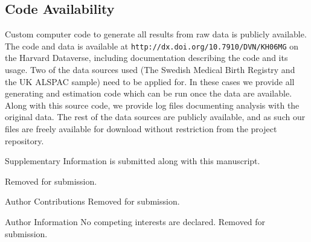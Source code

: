 \documentclass{nature}
\begin{document}
\begin{linenumbers}
\subsection{Code Availability}
Custom computer code to generate all results from raw data is publicly available. The code and data is available at \texttt{http://dx.doi.org/10.7910/DVN/KH06MG} on the Harvard Dataverse, including documentation describing the code and its usage. Two of the data sources used (The Swedish Medical Birth Registry and the UK ALSPAC sample) need to be applied for. In these cases we provide all generating and estimation code which can be run once the data are available. Along with this source code, we provide log files documenting analysis with the original data.  The rest of the data sources are publicly available, and as such our files are freely available for download without restriction from the project repository.




\clearpage


\clearpage
\begin{addendum}
 \item[Supplementary Information] is submitted along with this manuscript.
 \item Removed for submission. %
 \item[Author Contributions]  Removed for submission. %
 \item[Author Information] No competing interests are declared.  Removed for submission. %
\end{addendum}


\end{linenumbers}
\end{document}
